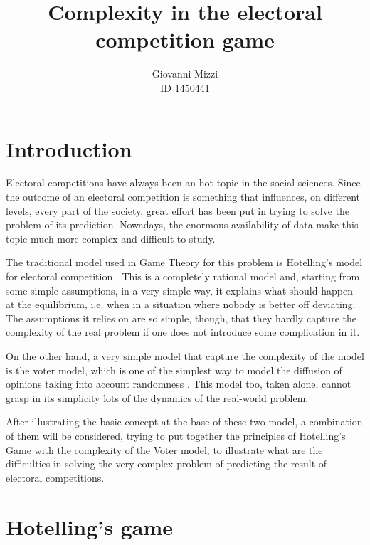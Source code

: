 \documentclass[11pt,a4paper,twocolumn]{article}
\author{Giovanni Mizzi \\ID 1450441}
\title{\textbf{Complexity in the electoral competition game}}
\begin{document}
\maketitle

\section*{Introduction}
\vspace*{-0.2cm}
Electoral competitions have always been an hot topic in the social sciences. Since the outcome of an electoral competition is something that influences, on different levels, every part of the society, great effort has been put in trying to solve the problem of its prediction.
Nowadays, the enormous availability of data make this topic much more complex and difficult to study. 

The traditional model used in Game Theory for this problem is Hotelling's model for electoral competition \cite{hotelling}. This is a completely rational model and, starting from some simple assumptions, in a very simple way, it explains what should happen at the equilibrium, i.e. when in a situation where nobody is better off deviating. The assumptions it relies on are so simple, though, that they hardly capture the complexity of the real problem if one does not introduce some complication in it.

On the other hand, a very simple model that capture the complexity of the model is the voter model, which is one of the simplest way to model the diffusion of opinions taking into account randomness \cite{voter}. This model too, taken alone, cannot grasp in its simplicity lots of the dynamics of the real-world problem.

After illustrating the basic concept at the base of these two model, a combination of them will be considered, trying to put together the principles of Hotelling's Game with the complexity of the Voter model, to illustrate what are the difficulties in solving the very complex problem of predicting the result of electoral competitions.

\section*{Hotelling's game}
\vspace*{-0.2cm}
\end{document}
